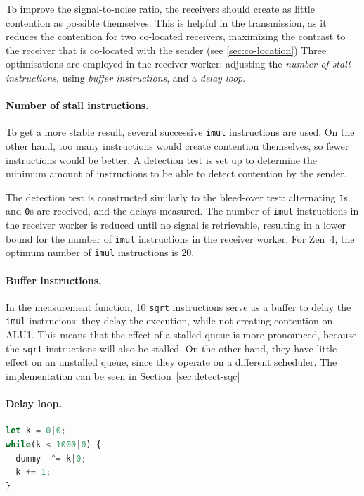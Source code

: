 \documentclass[11pt,
  titlepage=false,
  parskip=half,      %
]{scrreprt}
\begin{document}
To improve the signal-to-noise ratio, the receivers should create as little contention as possible themselves.
This is helpful in the transmission, as it reduces the contention for two co-located receivers,
maximizing the contrast to the receiver that is co-located with the sender (see \ref{sec:co-location})
Three optimisations are employed in the receiver worker: adjusting the \textit{number of stall instructions},
using \textit{buffer instructions}, and a \textit{delay loop}.

\paragraph{Number of stall instructions.}
To get a more stable result, several successive \texttt{imul} instructions are used.
On the other hand, too many instructions would create contention themselves, so fewer instructions would be better.
A detection test is set up to determine the minimum amount of instructions to be able to detect contention by the sender.

The detection test is constructed similarly to the bleed-over test:
alternating \texttt{1}s and \texttt{0}s are received, and the delays measured.
The number of \texttt{imul} instructions in the receiver worker is reduced until no signal is retrievable,
resulting in a lower bound for the number of \texttt{imul} instructions in the receiver worker.
For Zen~4, the optimum number of \texttt{imul} instructions is $20$.

\paragraph{Buffer instructions.}
In the measurement function, 10 \texttt{sqrt} instructions serve as a buffer to delay the \texttt{imul} instrucions:
they delay the execution, while not creating contention on ALU1.
This means that the effect of a stalled queue is more pronounced, because the \texttt{sqrt} instructions will also be stalled.
On the other hand, they have little effect on an unstalled queue, since they operate on a different scheduler.
The implementation can be seen in Section~\ref{sec:detect-sqc}

\paragraph{Delay loop.}
\begin{lstlisting}[float,caption={The delay loop after a measurement},label={lst:delayloop},language=JavaScript]
let k = 0|0;
while(k < 1000|0) {
  dummy  ^= k|0;
  k += 1;
}
\end{lstlisting}
\end{document}
